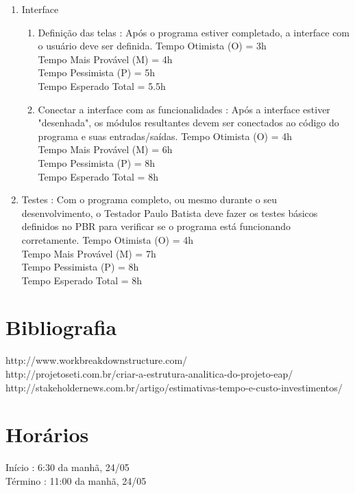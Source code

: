 \documentclass[12pt,a4paper,final]{report}
\begin{document}
\begin{enumerate}
\item Interface
\begin{enumerate}
\item Definição das telas : Após o programa estiver completado, a interface com o usuário deve ser definida.
Tempo Otimista (O) = 3h\\
Tempo Mais Provável (M) = 4h\\
Tempo Pessimista (P) = 5h\\
Tempo Esperado Total = 5.5h
\item Conectar a interface com as funcionalidades : Após a interface estiver "desenhada", os módulos resultantes devem ser conectados ao código do programa e suas entradas/saídas.
Tempo Otimista (O) = 4h\\
Tempo Mais Provável (M) = 6h\\
Tempo Pessimista (P) = 8h\\
Tempo Esperado Total = 8h
\end{enumerate}

\item Testes : Com o programa completo, ou mesmo durante o seu desenvolvimento, o Testador Paulo Batista deve fazer os testes básicos definidos no PBR para verificar se o programa está funcionando corretamente.
Tempo Otimista (O) = 4h\\
Tempo Mais Provável (M) = 7h\\
Tempo Pessimista (P) = 8h\\
Tempo Esperado Total = 8h

\end{enumerate}

\section*{Bibliografia}
http://www.workbreakdownstructure.com/\\
http://projetoseti.com.br/criar-a-estrutura-analitica-do-projeto-eap/\\
http://stakeholdernews.com.br/artigo/estimativas-tempo-e-custo-investimentos/

\section*{Horários}
Início : 6:30 da manhã, 24/05\\
Término : 11:00 da manhã, 24/05
\end{document}
